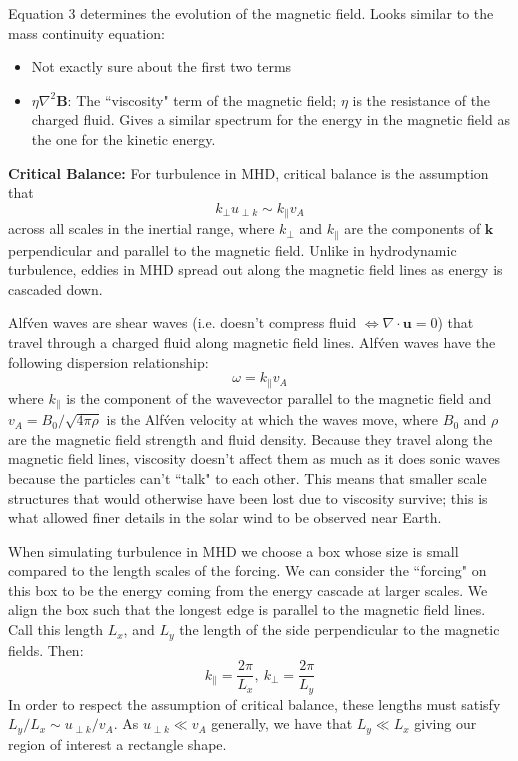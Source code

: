 \documentclass[12pt,letterpaper]{article}
\newcommand{\B}[1]{\mathbf{#1}}
\begin{document}
  Equation 3 determines the evolution of the magnetic field. Looks similar to the mass continuity equation:
  \begin{itemize}
    \item Not exactly sure about the first two terms

    \item $\eta \nabla^2\B{B}$: The ``viscosity" term of the magnetic field; $\eta$ is the resistance of the charged fluid. Gives a similar spectrum for the energy in the magnetic field as the one for the kinetic energy.
  \end{itemize}

  \textbf{Critical Balance:} For turbulence in MHD, critical balance is the assumption that
  $$
    k_\perp u_{\perp k} \sim k_\| v_A
  $$
  across all scales in the inertial range, where $k_\perp$ and $k_\|$ are the components of $\B{k}$ perpendicular and parallel to the magnetic field. Unlike in hydrodynamic turbulence, eddies in MHD spread out along the magnetic field lines as energy is cascaded down.

  Alf\'ven waves are shear waves (i.e. doesn't compress fluid $\iff \nabla\cdot\B{u}=0$) that travel through a charged fluid along magnetic field lines. Alf\'ven waves have the following dispersion relationship:
  $$
    \omega = k_\| v_A
  $$
  where $k_\|$ is the component of the wavevector parallel to the magnetic field and $v_A = B_0 / \sqrt{4\pi \rho}$ is the Alf\'ven velocity at which the waves move, where $B_0$ and $\rho$ are the magnetic field strength and fluid density. Because they travel along the magnetic field lines, viscosity doesn't affect them as much as it does sonic waves because the particles can't ``talk" to each other. This means that smaller scale structures that would otherwise have been lost due to viscosity survive; this is what allowed finer details in the solar wind to be observed near Earth.

  When simulating turbulence in MHD we choose a box whose size is small compared to the length scales of the forcing. We can consider the ``forcing" on this box to be the energy coming from the energy cascade at larger scales. We align the box such that the longest edge is parallel to the magnetic field lines. Call this length $L_x$, and $L_y$ the length of the side perpendicular to the magnetic fields. Then:
  $$
    k_\| = \frac{2\pi}{L_x}, \ k_\perp = \frac{2\pi}{L_y}
  $$
  In order to respect the assumption of critical balance, these lengths must satisfy
  $L_y/L_x \sim u_{\perp k}/v_A$. As $u_{\perp k} \ll v_A$ generally, we have that $L_y \ll L_x$ giving our region of interest a rectangle shape.
\end{document}
